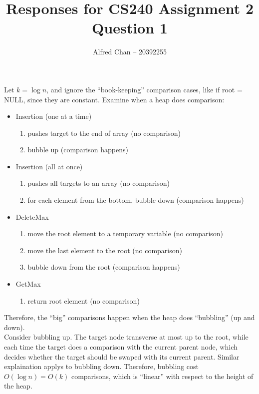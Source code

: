 \documentclass[12pt]{article}
\title{Responses for CS240 Assignment 2 Question 1}
\author{Alfred Chan -- 20392255}
\begin{document}
\lstset{
	language=bash,
	numbers=left,
	showspaces=false,
	showstringspaces=false,
	stepnumber=1,
	basicstyle=\ttfamily,
	frame=single,
	breaklines=true,
	tabsize=2
}
\maketitle
Let $k = \log n$, and ignore the ``book-keeping'' comparison cases, like if root = NULL, since they are constant. Examine when a heap does comparison:
\begin{itemize}
\item Insertion (one at a time)
	\begin{enumerate}
		\item pushes target to the end of array (no comparison)
		\item bubble up (comparison happens)
	\end{enumerate}
\item Insertion (all at once)
	\begin{enumerate}
		\item pushes all targets to an array (no comparison)
		\item for each element from the bottom, bubble down (comparison happens)
	\end{enumerate}
\item DeleteMax
	\begin{enumerate}
		\item move the root element to a temporary variable (no comparison)
		\item move the last element to the root (no comparison)
		\item bubble down from the root (comparison happens)
	\end{enumerate}
\item GetMax
	\begin{enumerate}
		\item return root element (no comparison)
	\end{enumerate}
\end{itemize}
Therefore, the ``big'' comparisons happen when the heap does ``bubbling'' (up and down).\\

Consider bubbling up.
The target node transverse at most up to the root, while each time the target does a comparison with the current parent node, which decides whether the target should be swaped with its current parent.
Similar explaination applys to bubbling down.
Therefore, bubbling cost $O(\log n) = O(k)$ comparisons, which is ``linear'' with respect to the height of the heap.\\
\end{document}
